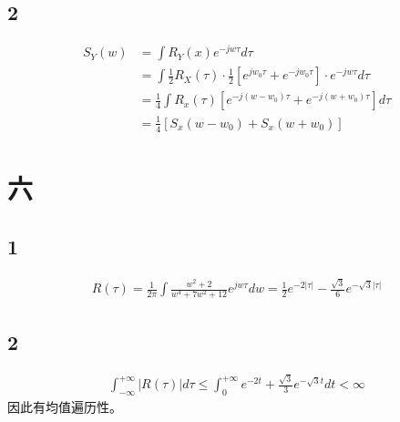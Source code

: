 \documentclass{article}
\begin{document}
\subsection*{2}
\begin{align*}
    S_{Y}(w)&=\int R_{Y}(x)e^{-jw\tau}d\tau \\
    &=\int\frac12R_{X}(\tau)\cdot\frac12[e^{jw_{0}\tau}+e^{-jw_{0}\tau}]\cdot e^{-jw\tau}d\tau\\
    &= \frac{1}{4}\int R_{x}(\tau)[e^{-j(w-w_{0})\tau}+e^{-j(w+w_{0})\tau}]d\tau \\
    &=\frac{1}{4}[S_{x}(w-w_{0})+S_{x}(w+w_{0})]
\end{align*}
\section*{六}
\subsection*{1}
\begin{align*}
    R(\tau)=\frac{1}{2\pi}\int\frac{w^{2}+2}{w^{4}+7w^{2}+12}e^{jw\tau}dw=\frac{1}{2}e^{-2|\tau|}-\frac{\sqrt{3}}{6}e^{-\sqrt{3}|\tau|}
\end{align*}
\subsection*{2}
\begin{align*}
    \int_{-\infty}^{+\infty}|R(\tau)|d\tau \leq\int_{0}^{+\infty}e^{-2t}+\frac{\sqrt{3}}{3}e^{-\sqrt{3}t}dt<\infty 
\end{align*}
因此有均值遍历性。
\end{document}
